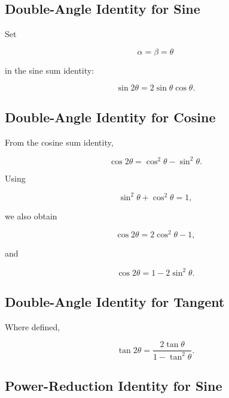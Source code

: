 \subsection{Double-Angle Identity for Sine}
\label{subsec:sine-double-angle}

Set

\[
\alpha=\beta=\theta
\]

in the sine sum identity:

\[
\boxed{
\sin2\theta
=
2\sin\theta\cos\theta.
}
\]

\subsection{Double-Angle Identity for Cosine}
\label{subsec:cosine-double-angle}

From the cosine sum identity,

\[
\boxed{
\cos2\theta
=
\cos^2\theta-\sin^2\theta.
}
\]

Using

\[
\sin^2\theta+\cos^2\theta=1,
\]

we also obtain

\[
\boxed{
\cos2\theta
=
2\cos^2\theta-1,
}
\]

and

\[
\boxed{
\cos2\theta
=
1-2\sin^2\theta.
}
\]

\subsection{Double-Angle Identity for Tangent}
\label{subsec:tangent-double-angle}

Where defined,

\[
\boxed{
\tan2\theta
=
\frac{
2\tan\theta
}{
1-\tan^2\theta
}.
}
\]

\subsection{Power-Reduction Identity for Sine}
\label{subsec:sine-power-reduction}

